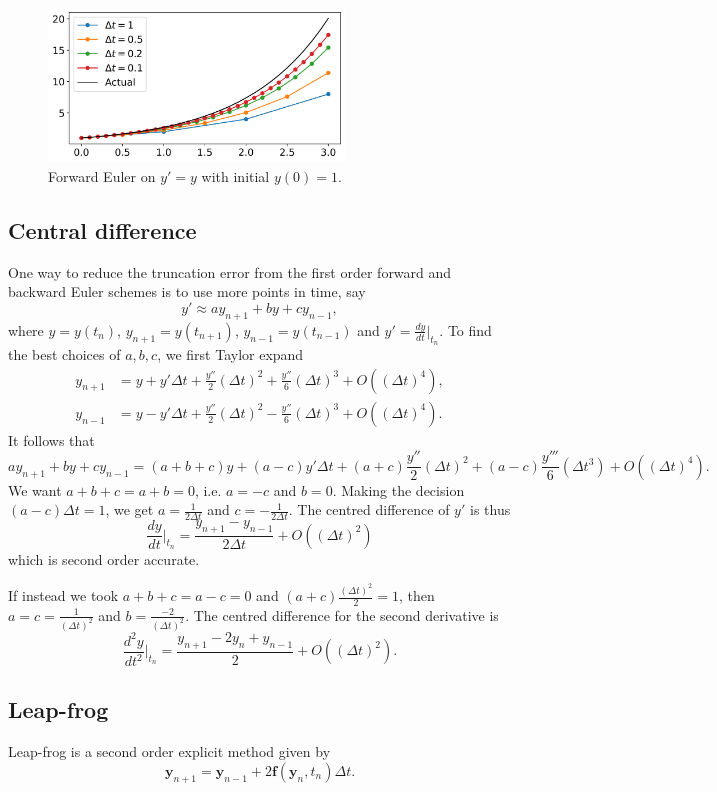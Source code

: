 \documentclass[11pt, a4paper]{article}
\theoremstyle{break}
\newcommand{\ve}{\mathbf} %
\newcommand{\dt}{\Delta t}
\newcommand{\dder}[2]{\frac{d #1}{d #2}}
\newcommand{\ddder}[3][2]{\frac{d^#1 #2}{d #3^#1}}
\newcommand{\eval}[1]{\big\rvert_{#1}}
\newcommand{\Eval}[1]{\bigg\rvert_{#1}}
\begin{document}
\begin{figure}\centering
	\includegraphics[width=0.7\textwidth]{forwardEuler}
	\caption{Forward Euler on $y'=y$ with initial $y(0)=1$.}\label{fig:euler}
\end{figure}

\subsection{Central difference}
One way to reduce the truncation error from the first order forward and backward Euler schemes is to use more points in time, say \[y'\approx a	y_{n+1}+by+cy_{n-1},\] where $y=y(t_n)$, $y_{n+1}=y(t_{n+1})$, $y_{n-1}=y(t_{n-1})$ and $y' = \dder yt\eval{t_n}$. To find the best choices of $a,b,c$, we first Taylor expand \begin{align*}
y_{n+1}&=y+y'\dt+\frac{y''}{2}(\dt)^2+\frac{y''}{6}(\dt)^3+O((\dt)^4),\\
y_{n-1}&=y-y'\dt+\frac{y''}{2}(\dt)^2-\frac{y''}{6}(\dt)^3+O((\dt)^4).
\end{align*} It follows that \[ay_{n+1}+by+cy_{n-1}=(a+b+c)y+(a-c)y'\dt+(a+c)\frac{y''}{2}(\dt)^2 +(a-c)\frac{y'''}{6}(\dt^3)+O((\dt)^4).\]
We want $a+b+c=a+b=0$, i.e. $a=-c$ and $b=0$. Making the decision $(a-c)\dt=1$, we get $a=\frac1{2\dt}$ and $c=-\frac1{2\dt}$. The centred difference of $y'$ is thus \[\dder yt\Eval{t_n}=\frac{y_{n+1}-y_{n-1}}{2\dt}+O((\dt)^2)\] which is second order accurate.

If instead we took $a+b+c=a-c=0$ and $(a+c)\frac{(\dt)^2}{2}=1$, then $a=c=\frac1{(\dt)^2}$ and $b=\frac{-2}{(\dt)^2}$. The centred difference for the second derivative is \[\ddder yt\Eval{t_n}=\frac{y_{n+1}-2y_n+y_{n-1}}{2}+O((\dt)^2).\]

\subsection{Leap-frog}
Leap-frog is a second order explicit method given by
\[\ve y_{n+1}=\ve y_{n-1}+2\ve f(\ve y_n,t_n)\dt.\]
\end{document}
